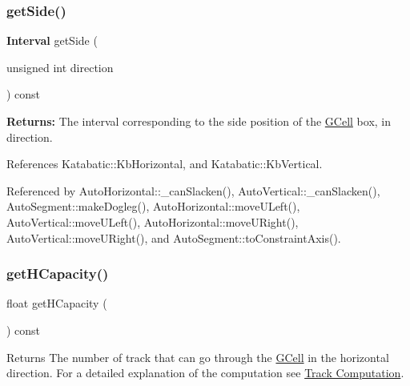 \mbox{\label{classKatabatic_1_1GCell_a10f3dd5001b2015e34a9aacdacf6eae6}} 
\subsubsection{\texorpdfstring{get\+Side()}{getSide()}}
{\footnotesize\ttfamily \textbf{ Interval} get\+Side (\begin{DoxyParamCaption}\item[{unsigned int}]{direction }\end{DoxyParamCaption}) const}

{\bfseries Returns\+:} The interval corresponding to the side position of the \hyperlink{classKatabatic_1_1GCell}{G\+Cell} box, in {\ttfamily direction}. 

References Katabatic\+::\+Kb\+Horizontal, and Katabatic\+::\+Kb\+Vertical.



Referenced by Auto\+Horizontal\+::\+\_\+can\+Slacken(), Auto\+Vertical\+::\+\_\+can\+Slacken(), Auto\+Segment\+::make\+Dogleg(), Auto\+Horizontal\+::move\+U\+Left(), Auto\+Vertical\+::move\+U\+Left(), Auto\+Horizontal\+::move\+U\+Right(), Auto\+Vertical\+::move\+U\+Right(), and Auto\+Segment\+::to\+Constraint\+Axis().

\mbox{\label{classKatabatic_1_1GCell_ad0dda8d59162b90040263fc55d7da714}} 
\subsubsection{\texorpdfstring{get\+H\+Capacity()}{getHCapacity()}}
{\footnotesize\ttfamily float get\+H\+Capacity (\begin{DoxyParamCaption}{ }\end{DoxyParamCaption}) const}

\begin{DoxyReturn}{Returns}
The number of track that can go through the \hyperlink{classKatabatic_1_1GCell}{G\+Cell} in the horizontal direction. For a detailed explanation of the computation see \hyperlink{classKatabatic_1_1GCell_secGCellTrackComputation}{Track Computation}. 
\end{DoxyReturn}


